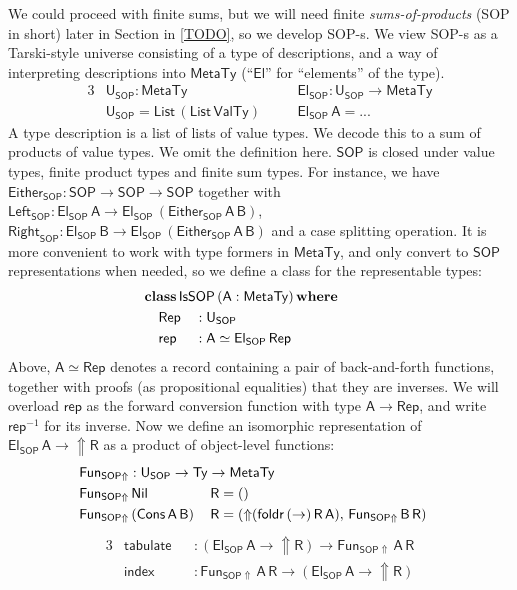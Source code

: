 \documentclass[acmsmall,screen,review,anonymous]{acmart}
\newcommand{\mit}[1]{{\mathsf{#1}}}
\newcommand{\msf}[1]{{\mathsf{#1}}}
\newcommand{\mbf}[1]{{\mathbf{#1}}}
\newcommand{\ind}{\hspace{1em}}
\newcommand{\where}{\mbf{where}}
\newcommand{\vA}{\mathsf{A}}
\newcommand{\vB}{\mathsf{B}}
\newcommand{\vR}{\mathsf{R}}
\newcommand{\SOP}{\msf{SOP}}
\newcommand{\El}{\msf{El}}
\newcommand{\USOP}{\msf{U}_{\msf{SOP}}}
\newcommand{\IsSOP}{\msf{IsSOP}}
\newcommand{\List}{\msf{List}}
\newcommand{\Nil}{\msf{Nil}}
\newcommand{\Cons}{\msf{Cons}}
\newcommand{\Lift}{{\Uparrow}}
\newcommand{\MTy}{\msf{MetaTy}}
\newcommand{\VTy}{\msf{ValTy}}
\newcommand{\Ty}{\msf{Ty}}
\theoremstyle{remark}
\newcommand{\tyclass}{\mbf{class}}
\newcommand{\Either}{\msf{Either}}
\newcommand{\Left}{\msf{Left}}
\newcommand{\Right}{\msf{Right}}
\newcommand{\Rep}{\mit{Rep}}
\newcommand{\mindex}{\mit{index}}
\newcommand{\mtabulate}{\mit{tabulate}}
\begin{document}
We could proceed with finite sums, but we will need finite
\emph{sums-of-products} (SOP in short) later in Section in \ref{TODO}, so we
develop SOP-s. We view SOP-s as a Tarski-style universe consisting of a type of
descriptions, and a way of interpreting descriptions into $\MTy$ (``$\El$'' for
``elements'' of the type).
\begin{alignat*}{3}
  &\USOP : \MTy                    &&\ind \El_\SOP : \USOP \to \MTy \\
  &\USOP = \List\,(\List\,\VTy)    &&\ind \El_\SOP\,\vA = ...
\end{alignat*}
A type description is a list of lists of value types. We decode this to a sum of
products of value types. We omit the definition here. $\SOP$ is closed under
value types, finite product types and finite sum types. For instance, we have
$\Either_\SOP : \SOP \to \SOP \to \SOP$ together with $\Left_\SOP : \El_\SOP\,\vA
\to \El_\SOP\,(\Either_\SOP\,\vA\,\vB)$, $\Right_\SOP : \El_\SOP\,\vB \to
\El_\SOP\,(\Either_\SOP\,\vA\,\vB)$ and a case splitting operation. It is more
convenient to work with type formers in $\MTy$, and only convert to $\SOP$
representations when needed, so we define a class for the representable types:
\begin{alignat*}{3}
  & \hspace{-5em}\mathrlap{\tyclass\,\IsSOP\,(\vA : \MTy)\,\where} \\
  & \hspace{-5em}\ind \Rep      &&: \USOP \\
  & \hspace{-5em}\ind \mit{rep} &&: \vA \simeq \El_\SOP\,\Rep
\end{alignat*}
Above, $\vA \simeq \Rep$ denotes a record containing a pair of back-and-forth
functions, together with proofs (as propositional equalities) that they are
inverses. We will overload $\mit{rep}$ as the forward conversion function with
type $\vA \to \Rep$, and write $\mit{rep}^{-1}$ for its inverse. Now we define
an isomorphic representation of $\El_\SOP\,\vA \to \Lift \vR$ as a product of
object-level functions:
\begin{alignat*}{3}
  &\mathrlap{\mit{Fun}_{\SOP\Lift} : \USOP \to \Ty \to \MTy}\\
  &\mit{Fun}_{\SOP\Lift}\,\Nil\,&& \vR = ()\\
  &\mit{Fun}_{\SOP\Lift}\,(\Cons\,\vA\,\vB)\,&& \vR = (\Lift(\mit{foldr}\,(\to)\,\vR\,\vA),\,\mit{Fun}_{\SOP\Lift}\,\vB\,\vR)
\end{alignat*}
\begin{alignat*}{3}
  &\mtabulate &&: (\El_\SOP\,\vA \to \Lift \vR) \to \mit{Fun}_{\SOP\Lift}\,\vA\,\vR\\
  &\mindex    &&: \mit{Fun}_{\SOP\Lift}\,\vA\,\vR \to (\El_\SOP\,\vA \to \Lift \vR)
\end{alignat*}
\end{document}
